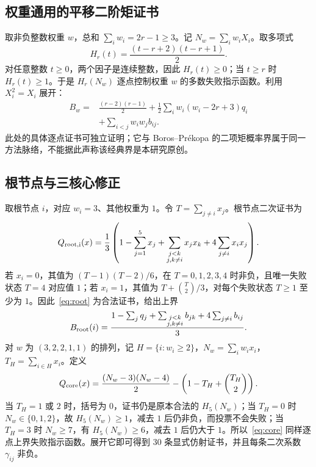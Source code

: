 \documentclass[11pt,a4paper]{ctexart}
\theoremstyle{definition}
\begin{document}
\subsection{权重通用的平移二阶矩证书}
取非负整数权重 $w$，总和 $\sum_iw_i=2r-1\ge3$。记 $N_w=\sum_iw_iX_i$。取多项式
\begin{equation}\label{eq:BP}
H_r(t)=\frac{(t-r+2)(t-r+1)}2.
\end{equation}
对任意整数 $t\ge0$，两个因子是连续整数，因此 $H_r(t)\ge0$；当 $t\ge r$ 时 $H_r(t)\ge1$。于是 $H_r(N_w)$ 逐点控制权重 $w$ 的多数失败指示函数。利用 $X_i^2=X_i$ 展开：
\begin{equation}\label{eq:BPbound}
\boxed{\begin{aligned}
B_w={}&\frac{(r-2)(r-1)}2
+\frac12\sum_i w_i(w_i-2r+3)q_i\\
&+\sum_{i<j}w_iw_jb_{ij}.
\end{aligned}}
\end{equation}
此处的具体逐点证书可独立证明；它与 Boros--Pr\'ekopa 的二项矩概率界属于同一方法脉络\cite{BP1989}，不能据此声称该经典界是本研究原创。

\subsection{根节点与三核心修正}
取根节点 $i$，对应 $w_i=3$、其他权重为 $1$。令 $T=\sum_{j\ne i}x_j$。根节点二次证书为
\begin{equation}\label{eq:root}
Q_{\rm root,i}(x)=\frac13\left(1-\sum_{j=1}^5x_j+\sum_{\substack{j<k\\j,k\ne i}}x_jx_k+4\sum_{j\ne i}x_ix_j\right).
\end{equation}
若 $x_i=0$，其值为 $(T-1)(T-2)/6$，在 $T=0,1,2,3,4$ 时非负，且唯一失败状态 $T=4$ 对应值 $1$；若 $x_i=1$，其值为 $T+\binom{T}{2}/3$，对每个失败状态 $T\ge1$ 至少为 $1$。因此~\eqref{eq:root} 为合法证书，给出上界
\begin{equation}\label{eq:rootbound}
B_{\rm root}(i)=\frac{1-\sum_jq_j+\sum_{\substack{j<k\\j,k\ne i}}b_{jk}+4\sum_{j\ne i}b_{ij}}3.
\end{equation}
对 $w$ 为 $(3,2,2,1,1)$ 的排列，记 $H=\{i:w_i\ge2\}$，$N_w=\sum_iw_ix_i$，$T_H=\sum_{i\in H}x_i$。定义
\begin{equation}\label{eq:core}
Q_{\rm core}(x)=\frac{(N_w-3)(N_w-4)}2-\left(1-T_H+\binom{T_H}{2}\right).
\end{equation}
当 $T_H=1$ 或 $2$ 时，括号为 $0$，证书仍是原本合法的 $H_5(N_w)$；当 $T_H=0$ 时 $N_w\in\{0,1,2\}$，故 $H_5(N_w)\ge1$，减去 $1$ 后仍非负，而投票不会失败；当 $T_H=3$ 时 $N_w\ge7$，有 $H_5(N_w)\ge6$，减去 $1$ 后仍大于 $1$。所以~\eqref{eq:core} 同样逐点上界失败指示函数。展开它即可得到 30 条显式仿射证书，并且每条二次系数 $\gamma_{ij}$ 非负。
\end{document}
